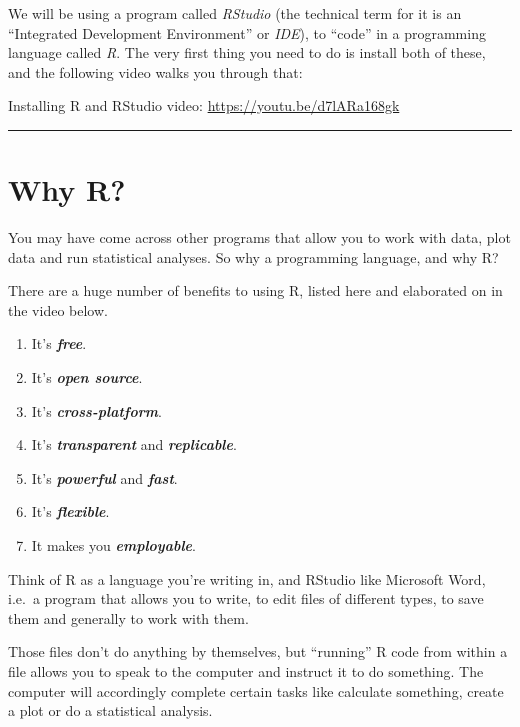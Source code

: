 \documentclass[
]{book}
\providecommand{\tightlist}{%
  \setlength{\itemsep}{0pt}\setlength{\parskip}{0pt}}
\begin{document}
We will be using a program called \emph{RStudio} (the technical term for it is an
``Integrated Development Environment'' or \emph{IDE}), to ``code'' in a programming
language called \emph{R}. The very first thing you need to do is install both of
these, and the following video walks you through that:

Installing R and RStudio video: \url{https://youtu.be/d7lARa168gk}
~

\begin{center}\rule{0.5\linewidth}{0.5pt}\end{center}

\hypertarget{why-r}{%
\section{Why R?}\label{why-r}}

You may have come across other programs that allow you to work with data,
plot data and run statistical analyses. So why a programming language, and why
R?

There are a huge number of benefits to using R, listed here and elaborated on in
the video below.

\begin{enumerate}
\def\labelenumi{\arabic{enumi}.}
\tightlist
\item
  It's \textbf{\emph{free}}.
\item
  It's \textbf{\emph{open source}}.
\item
  It's \textbf{\emph{cross-platform}}.
\item
  It's \textbf{\emph{transparent}} and \textbf{\emph{replicable}}.
\item
  It's \textbf{\emph{powerful}} and \textbf{\emph{fast}}.
\item
  It's \textbf{\emph{flexible}}.
\item
  It makes you \textbf{\emph{employable}}.
\end{enumerate}

Think of R as a language you're writing in, and
RStudio like Microsoft Word, i.e.~a program that allows you to write,
to edit files of different types, to save them and generally to work with them.

Those files don't do anything by themselves, but ``running'' R code from within a file allows you
to speak to the computer and instruct it to do something. The computer will accordingly
complete certain tasks like calculate something, create a plot or do a statistical
analysis.
\end{document}
